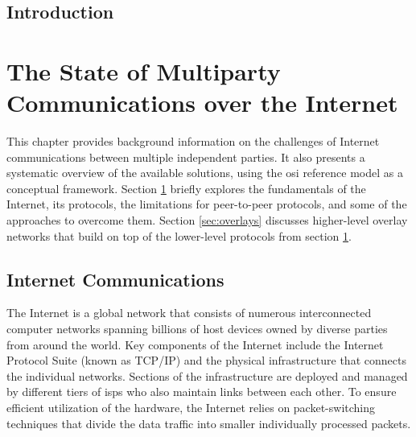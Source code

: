 \tableofcontents

\todototoc

\listoftodos

\printnoidxglossary[type=\acronymtype,title=Glossary]

\listoffigures

\mainmatter

\hypertarget{introduction}{%
\chapter{Introduction}\label{introduction}}

\hypertarget{the-state-of-multiparty-communications-over-the-internet}{%
\part{The State of Multiparty Communications over the
Internet}\label{the-state-of-multiparty-communications-over-the-internet}}


This chapter provides background information on the challenges of
Internet communications between multiple independent parties. It also
presents a systematic overview of the available solutions, using the
\gls{osi} reference model as a conceptual framework. Section
\ref{sec:internet} briefly explores the fundamentals of the Internet,
its protocols, the limitations for peer-to-peer protocols, and some of
the approaches to overcome them. Section \ref{sec:overlays} discusses
higher-level overlay networks that build on top of the lower-level
protocols from section \ref{sec:internet}.

\hypertarget{sec:internet}{%
\chapter{Internet Communications}\label{sec:internet}}


The Internet is a global network that consists of numerous
interconnected computer networks spanning billions of host devices owned
by diverse parties from around the world. Key components of the Internet
include the Internet Protocol Suite (known as TCP/IP) and the physical
infrastructure that connects the individual networks. Sections of the
infrastructure are deployed and managed by different tiers of
\glspl{isp} who also maintain links between each other. To ensure
efficient utilization of the hardware, the Internet relies on
packet-switching techniques that divide the data traffic into smaller
individually processed packets.


